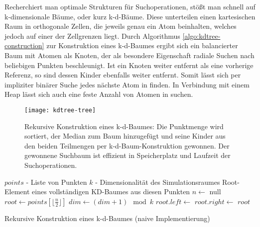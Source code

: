 Recherchiert man optimale Strukturen für Suchoperationen, stößt man schnell auf k-dimensionale Bäume, oder kurz k-d-Bäume.
Diese unterteilen einen kartesischen Raum in orthogonale Zellen, die jeweils genau ein Atom beinhalten, welches jedoch auf einer der Zellgrenzen liegt.
Durch Algorithmus \ref{algo:kdtree-construction} zur Konstruktion eines k-d-Baumes ergibt sich ein balancierter Baum mit Atomen als Knoten, der als besondere Eigenschaft radiale Suchen nach beliebigen Punkten beschleunigt.
Ist ein Knoten weiter entfernt als eine vorherige Referenz, so sind dessen Kinder ebenfalls weiter entfernt.
Somit lässt sich per impliziter binärer Suche jedes nächste Atom in  finden.
In Verbindung mit einem Heap lässt sich auch eine feste Anzahl von Atomen in  suchen.

\begin{figure}[bthp]
  \texttt{[image: kdtree-tree]}
  \caption[Konstruktion eines k-d-Baumes]{
    Rekursive Konstruktion eines k-d-Baumes: Die Punktmenge wird sortiert, der Median zum Baum hinzugefügt und seine Kinder aus den beiden Teilmengen per k-d-Baum-Konstruktion gewonnen.
    Der gewonnene Suchbaum ist effizient in Speicherplatz und Laufzeit der Suchoperationen.
  }
  \label{fig:kdtree}
\end{figure}

\begin{algorithm}
  \begin{algorithmic}
    \Input $points$ - Liste von Punkten
    \Input $k$ - Dimensionalität des Simulationsraumes
    \Result Root-Element eines vollständigen KD-Baumes aus diesen Punkten
    \State
    \State $n\gets$
    \State \Return null
    \Else
    \State {} 
    \State $root\gets{}points\left[\lfloor\frac{n}{2}\rfloor\right]$
    \State $dim\gets(dim+1)\mod{k}$
    \State $root.left \gets$ 
    \State $root.right \gets$ 
    \State \Return $root$
    \EndIf
    \EndFunction
  \end{algorithmic}
  \caption[Konstruktion eines k-d-Baumes]{Rekursive Konstruktion eines k-d-Baumes (naive Implementierung)}
  \label{algo:kdtree-construction}
\end{algorithm}

